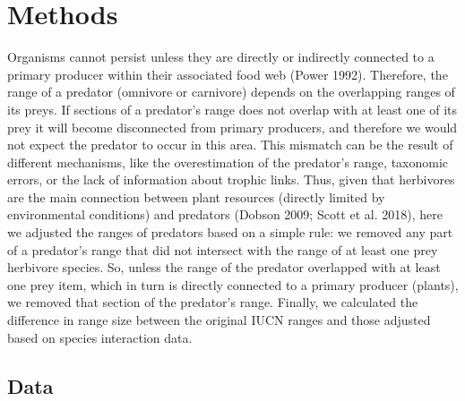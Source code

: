 \documentclass[11pt]{article}
\begin{document}
\hypertarget{methods}{%
\section{Methods}\label{methods}}

Organisms cannot persist unless they are directly or indirectly
connected to a primary producer within their associated food web (Power
1992). Therefore, the range of a predator (omnivore or carnivore)
depends on the overlapping ranges of its preys. If sections of a
predator's range does not overlap with at least one of its prey it will
become disconnected from primary producers, and therefore we would not
expect the predator to occur in this area. This mismatch can be the
result of different mechanisms, like the overestimation of the
predator's range, taxonomic errors, or the lack of information about
trophic links. Thus, given that herbivores are the main connection
between plant resources (directly limited by environmental conditions)
and predators (Dobson 2009; Scott et al. 2018), here we adjusted the
ranges of predators based on a simple rule: we removed any part of a
predator's range that did not intersect with the range of at least one
prey herbivore species. So, unless the range of the predator overlapped
with at least one prey item, which in turn is directly connected to a
primary producer (plants), we removed that section of the predator's
range. Finally, we calculated the difference in range size between the
original IUCN ranges and those adjusted based on species interaction
data.

\hypertarget{data}{%
\subsection{Data}\label{data}}
\end{document}
